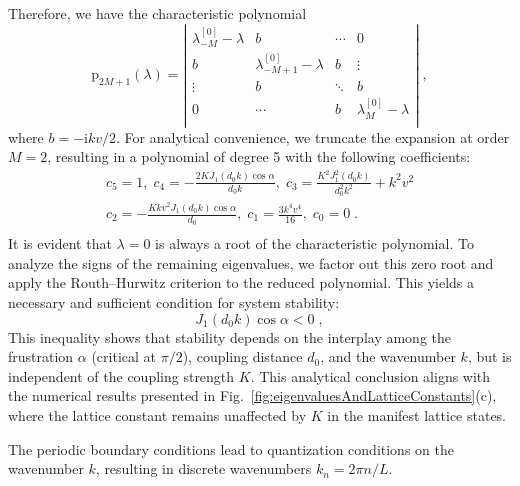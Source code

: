 \documentclass{article}
\begin{document}
Therefore, we have the characteristic polynomial
\begin{equation}
    \mathrm{p}_{2M+1}\left( \lambda \right) =\left| \begin{matrix}
	\lambda _{-M}^{\left[ 0 \right]}-\lambda&		b&		\cdots&		0\\
	b&		\lambda _{-M+1}^{\left[ 0 \right]}-\lambda&		b&		\vdots\\
	\vdots&		b&		\ddots&		b\\
	0&		\cdots&		b&		\lambda _{M}^{\left[ 0 \right]}-\lambda\\
\end{matrix} \right|\;,
\end{equation}
where $b=-\mathrm{i}kv/2$. For analytical convenience, we truncate the expansion at order $M=2$, resulting in a polynomial of degree 5 with the following coefficients:
\begin{equation}
    \begin{array}{c}
	c_5=1,\;c_4=-\frac{2KJ_1\left( d_0k \right) \cos \alpha}{d_0k},\;c_3=\frac{K^2J_{1}^{2}\left( d_0k \right)}{d_{0}^{2}k^2}+k^2v^2\\
	c_2=-\frac{Kkv^2J_1\left( d_0k \right) \cos \alpha}{d_0},\;c_1=\frac{3k^4v^4}{16},\;c_0=0\;.\\
\end{array}
\end{equation}
It is evident that $\lambda =0$ is always a root of the characteristic polynomial. To analyze the signs of the remaining eigenvalues, we factor out this zero root and apply the Routh–Hurwitz criterion to the reduced polynomial. This yields a necessary and sufficient condition for system stability:
\begin{equation}
    J_1\left( d_0k \right) \cos \alpha <0\;,
\end{equation}
This inequality shows that stability depends on the interplay among the frustration $\alpha$ (critical at $\pi/2$), coupling distance $d_0$, and the wavenumber $k$, but is independent of the coupling strength $K$. This analytical conclusion aligns with the numerical results presented in Fig.~\ref{fig:eigenvaluesAndLatticeConstants}(c), where the lattice constant remains unaffected by $K$ in the manifest lattice states.

The periodic boundary conditions lead to quantization conditions on the wavenumber $k$, resulting in discrete wavenumbers $k_n=2\pi n/L$. 

\end{document}
